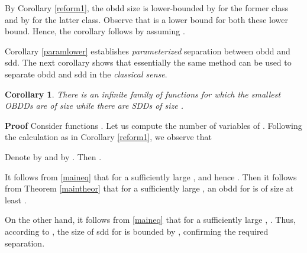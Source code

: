 \documentclass{article}
\newtheorem{corollary}{Corollary}
\begin{document}
By Corollary \ref{reform1}, the {\sc obdd} size is lower-bounded by
 for the former class
and by  for the latter class.
Observe that  is a lower bound for both
these lower bound. Hence, the corollary follows by assuming 
.

\begin{comment}
Observe that for an even  the primal graph treewidth of  is 
and that the above argumentation still applies. Indeed, since , it is 
legitimate to represent the lower bound as . Further on, in the inequality
that follows, the occurrence of  in the denominator (as an upper bound of
the actual treewidth) even strengthens this inequality.
\end{comment}
 

Corollary \ref{paramlower} establishes \emph{parameterized} separation between
{\sc obdd} and {\sc sdd}. The next corollary shows that essentially the same method
can be used to separate {\sc obdd} and {\sc sdd} in the \emph{classical sense}.

\begin{corollary}
There is an infinite family of functions for which the smallest OBDDs
are of size  while there are SDDs of size .
\end{corollary}

{\bf Proof}
Consider functions .
Let us compute the number  of variables of . 
Following the calculation as in Corollary \ref{reform1},
we observe that


Denote  by  and  by .
Then 
. 

It follows from \eqref{maineq} that for a sufficiently large ,
 and hence .
Then it follows from Theorem \ref{maintheor} that for a sufficiently
large , an {\sc obdd} for  is of size at least 
.

On the other hand, it follows from \eqref{maineq} 
that for a sufficiently large , .
Thus, according to \cite{SDD}, the size of {\sc sdd} for  is bounded by
, confirming the required separation.


\begin{comment}
Using this equality lower and upper bounds on 
in terms of  that hold for sufficiently large .
Then it follows from Theorem \ref{maintheor} that for a sufficiently
large , an OBDD for  is of size at least 
.

On the other hand, it follows .


The lower bound together with Theorem \ref{maintheor} imply that for a sufficiently
large , an OBDD for  is of size at least 
.

By Lemma \ref{twf}, the treewidth of the primal graph of  is at most
 which is at most  by the above upper bound.
Thus, according to \cite{SDD}, the size of {\sc sdd} for  is bounded by
, as required. 
\end{comment}
\end{document}
